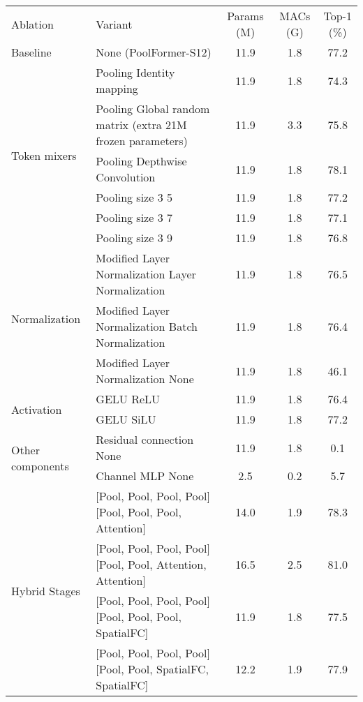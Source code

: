 \begin{table*}[t]
\small
\centering
\setlength{\tabcolsep}{2pt}
\begin{tabular}{l|l|c c c}
\toprule
	Ablation & Variant & Params (M) & MACs (G) & Top-1 (\%) \\
\whline
Baseline & None (PoolFormer-S12) & 11.9 & 1.8 & 77.2 \\
\hline
\multirow{6}{*}{Token mixers}  & Pooling  Identity mapping & 11.9 & 1.8 & 74.3 \\
             & Pooling  Global random matrix (extra 21M frozen
parameters) & 11.9 & 3.3 & 75.8 \\
             & Pooling  Depthwise Convolution \cite{chollet2017xception, mamalet2012simplifying} & 11.9 & 1.8 & 78.1 \\
             & Pooling size 3  5 & 11.9 & 1.8 & 77.2 \\
             & Pooling size 3  7 & 11.9 & 1.8 & 77.1 \\
             & Pooling size 3  9 & 11.9 & 1.8 & 76.8 \\
\hline
\multirow{3}{*}{Normalization}  & Modified Layer Normalization   Layer Normalization \cite{layer_norm} & 11.9 & 1.8 & 76.5 \\
             & Modified Layer Normalization  Batch Normalization \cite{batch_norm} & 11.9 & 1.8 & 76.4 \\
             & Modified Layer Normalization  None & 11.9 & 1.8 & 46.1 \\
\hline
\multirow{2}{*}{Activation}  & GELU \cite{gelu}   ReLU \cite{relu}  & 11.9 & 1.8 & 76.4 \\
             & GELU  SiLU \cite{silu} & 11.9 & 1.8 & 77.2 \\
\hline
\multirow{2}{*}{Other components}  & Residual connection \cite{gelu}   None  & 11.9 & 1.8 & 0.1 \\
             & Channel MLP  None & 2.5 & 0.2 & 5.7 \\
\hline
\multirow{4}{*}{Hybrid Stages}  & [Pool, Pool, Pool, Pool]   [Pool, Pool,                                 Pool, Attention] & 14.0 & 1.9 & 78.3 \\
                                & [Pool, Pool, Pool, Pool]   [Pool, Pool, Attention, Attention]  & 16.5 & 2.5 & 81.0 \\
                                & [Pool, Pool, Pool, Pool]   [Pool, Pool, Pool, SpatialFC] & 11.9 & 1.8 & 77.5  \\
                                & [Pool, Pool, Pool, Pool]   [Pool, Pool, SpatialFC, SpatialFC] & 12.2 & 1.9 & 77.9 \\
             

\end{tabular}
\end{table*}
